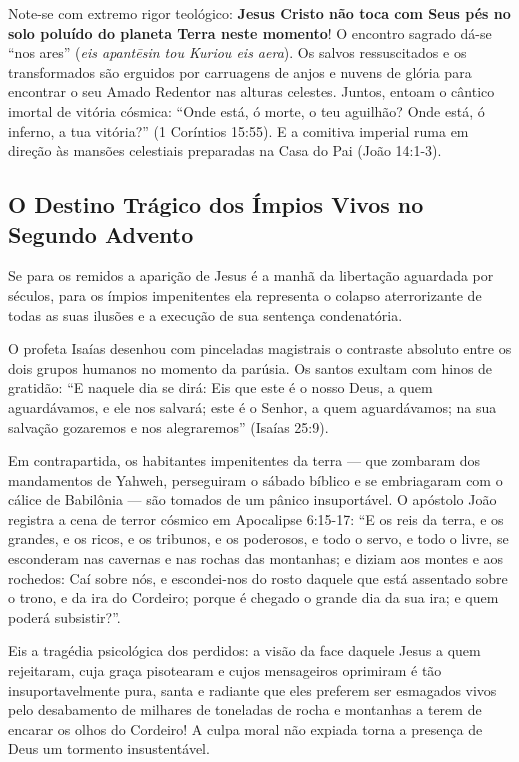 \documentclass[11pt,a4paper,openany]{book}
\begin{document}
Note-se com extremo rigor teológico: \textbf{Jesus Cristo não toca com Seus pés no solo poluído do planeta Terra neste momento}! O encontro sagrado dá-se ``nos ares'' (\textit{eis apantēsin tou Kuriou eis aera}). Os salvos ressuscitados e os transformados são erguidos por carruagens de anjos e nuvens de glória para encontrar o seu Amado Redentor nas alturas celestes. Juntos, entoam o cântico imortal de vitória cósmica: ``Onde está, ó morte, o teu aguilhão? Onde está, ó inferno, a tua vitória?'' (1 Coríntios 15:55). E a comitiva imperial ruma em direção às mansões celestiais preparadas na Casa do Pai (João 14:1-3).



\subsection{O Destino Trágico dos Ímpios Vivos no Segundo Advento}


Se para os remidos a aparição de Jesus é a manhã da libertação aguardada por séculos, para os ímpios impenitentes ela representa o colapso aterrorizante de todas as suas ilusões e a execução de sua sentença condenatória.

O profeta Isaías desenhou com pinceladas magistrais o contraste absoluto entre os dois grupos humanos no momento da parúsia.
Os santos exultam com hinos de gratidão:
``E naquele dia se dirá: Eis que este é o nosso Deus, a quem aguardávamos, e ele nos salvará; este é o Senhor, a quem aguardávamos; na sua salvação gozaremos e nos alegraremos'' (Isaías 25:9).

Em contrapartida, os habitantes impenitentes da terra — que zombaram dos mandamentos de Yahweh, perseguiram o sábado bíblico e se embriagaram com o cálice de Babilônia — são tomados de um pânico insuportável. O apóstolo João registra a cena de terror cósmico em Apocalipse 6:15-17:
``E os reis da terra, e os grandes, e os ricos, e os tribunos, e os poderosos, e todo o servo, e todo o livre, se esconderam nas cavernas e nas rochas das montanhas; e diziam aos montes e aos rochedos: Caí sobre nós, e escondei-nos do rosto daquele que está assentado sobre o trono, e da ira do Cordeiro; porque é chegado o grande dia da sua ira; e quem poderá subsistir?''.

Eis a tragédia psicológica dos perdidos: a visão da face daquele Jesus a quem rejeitaram, cuja graça pisotearam e cujos mensageiros oprimiram é tão insuportavelmente pura, santa e radiante que eles preferem ser esmagados vivos pelo desabamento de milhares de toneladas de rocha e montanhas a terem de encarar os olhos do Cordeiro! A culpa moral não expiada torna a presença de Deus um tormento insustentável.
\end{document}
